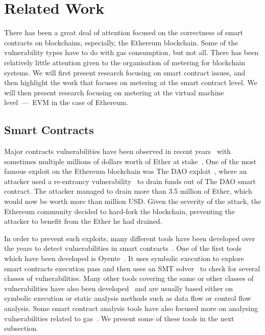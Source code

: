 \section{Related Work}
\label{sec:related}

There has been a great deal of attention focused on the correctness of smart contracts on blockchains, especially, the Ethereum blockchain. Some of the vulnerability types have to do with gas consumption, but not all. There has been relatively little attention given to the organisation of metering for blockchain systems. We will first present research focusing on smart contract issues, and then highlight the work that focuses on metering at the smart contract level. We will then present research focusing on metering at the virtual machine level~---~EVM in the case of Ethereum.

\subsection{Smart Contracts}
Major contracts vulnerabilities have been observed in recent years~\cite{Atzei2017} with sometimes multiple millions of dollars worth of Ether at stake~\cite{Securities2017,parity-wallet-freeze}.
One of the most famous exploit on the Ethereum blockchain was The DAO exploit~\cite{mehar2019understanding}, where an attacker used a re-entrancy vulnerability~\cite{Luu2016a,DBLP:conf/ndss/KalraGDS18} to drain funds out of The DAO smart contract. The attacker managed to drain more than 3.5 million of Ether, which would now be worth more than  million USD. Given the severity of the attack, the Ethereum community decided to hard-fork the blockchain, preventing the attacker to benefit from the Ether he had drained.

In order to prevent such exploits, many different tools have been developed over the years to detect vulnerabilities in smart contracts~\cite{harz2018towards}. One of the first tools which have been developed is Oyente~\cite{Luu2016a}. It uses symbolic execution to explore smart contracts execution pass and then uses an SMT solver~\cite{de2008z3} to check for several classes of vulnerabilities. Many other tools covering the same or other classes of vulnerabilities have also been developed~\cite{DBLP:conf/ndss/KalraGDS18,Brent2018,Tsankov:2018:SPS:3243734.3243780,Jiang:2018:CFS:3238147.3238177} and are usually based either on symbolic execution or static analysis methods such as data flow or control flow analysis. Some smart contract analysis tools have also focused more on analysing vulnerabilities related to gas~\cite{Grech2018,Chen2017,DBLP:journals/corr/abs-1811-10403}. We present some of these tools in the next subsection.


